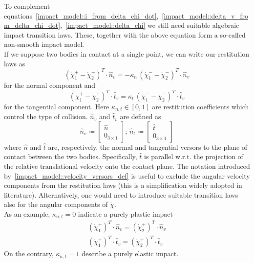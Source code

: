\documentclass[letterpaper, 10 pt, conference]{ieeeconf}  %
\begin{document}
To complement equations~\eqref{impact_model::i_from_delta_chi_dot},~\eqref{impact_model::delta_v_from_delta_chi_dot},~\eqref{impact_model::delta_chi} we still need suitable algebraic impact transition laws. These, together with the above equation form a so-called non-smooth impact model.\\
If we suppose two bodies in contact at a single point, we can write our restitution laws as
\begin{equation}\label{impact_model::algebraic_impact_trans_n}
\left(\dot{\chi}_{1}^{+}- \dot{\chi}_{2}^{+}\right)^T\cdot\hat{n}_v = - \kappa_n\,\left(\dot{\chi}_{1}^{-} - \dot{\chi}_{2}^{-}\right)^T\cdot\hat{n}_v
\end{equation}
for the normal component and
\begin{equation}\label{impact_model::algebraic_impact_trans_t}
\left(\dot{\chi}_{1}^{+}- \dot{\chi}_{2}^{+}\right)^T\cdot\hat{t}_v = \kappa_t\,\left(\dot{\chi}_{1}^{-} - \dot{\chi}_{2}^{-}\right)^T\cdot\hat{t}_v
\end{equation}
for the tangential component.
Here $\kappa_{n, t}\in\left[0, 1\right]$ are restitution coefficients which control the type of collision. $\hat{n}_v$ and $\hat{t}_v$ are defined as
\begin{equation}\label{impact_model::velocity_versors_def}
\hat{n}_v \coloneqq
\begin{bmatrix}
\hat{n}\\
0_{3\times 1}
\end{bmatrix};\,\hat{n}_t \coloneqq
\begin{bmatrix}
\hat{t}\\
0_{3\times 1}
\end{bmatrix}
\end{equation}
where $\hat{n}$ and $\hat{t}$ are, respectively, the normal and tangential versors to the plane of contact between the two bodies. Specifically, $\hat{t}$ is parallel w.r.t. the projection of the relative translational velocity onto the contact plane. The notation introduced by~\eqref{impact_model::velocity_versors_def} is useful to exclude the angular velocity components from the restitution laws (this is a simplification widely adopted in literature). Alternatively, one would need to introduce suitable transition laws also for the angular components of $\dot{\chi}$.\\
As an example, $\kappa_{n, t}=0$ indicate a purely plastic impact
\begin{eqnarray}\label{impact_model::perf_pl_imp_n}
\left(\dot{\chi}_{1}^{+}\right)^T\cdot\hat{n}_v =\left(\dot{\chi}_{2}^{+}\right)^T\cdot\hat{n}_v \\
\label{impact_model::perf_pl_imp_t}
\left(\dot{\chi}_{1}^{+}\right)^T\cdot\hat{t}_v =\left(\dot{\chi}_{2}^{+}\right)^T\cdot\hat{t}_v 
\end{eqnarray} 
On the contrary, $\kappa_{n, t}=1$ describe a purely elastic impact.
\end{document}
